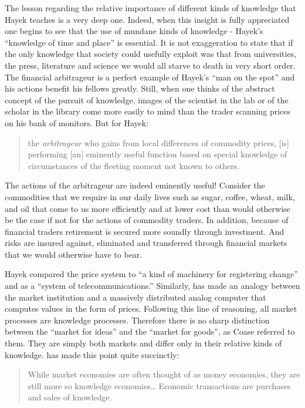 \documentclass[11pt,]{article}
\begin{document}
The lesson regarding the relative importance of different kinds of
knowledge that Hayek teaches is a very deep one. Indeed, when this
insight is fully appreciated one begins to see that the use of mundane
kinds of knowledge - Hayek's ``knowledge of time and place'' is
essential. It is not exaggeration to state that if the only knowledge
that society could usefully exploit was that from universities, the
press, literature and science we would all starve to death in very short
order. The financial arbitrageur is a perfect example of Hayek's ``man
on the spot'' and his actions benefit his fellows greatly. Still, when
one thinks of the abstract concept of the pursuit of knowledge, images
of the scientist in the lab or of the scholar in the library come more
easily to mind than the trader scanning prices on his bank of monitors.
But for Hayek:

\begin{quote}
the \emph{arbitrageur} who gains from local differences of commodity
prices, {[}is{]} performing {[}an{]} eminently useful function based on
special knowledge of circumstances of the fleeting moment not known to
others.
\end{quote}

The actions of the arbitrageur are indeed eminently useful! Consider the
commodities that we require in our daily lives such as sugar, coffee,
wheat, milk, and oil that come to us more efficiently and at lower cost
than would otherwise be the case if not for the actions of commodity
traders. In addition, because of financial traders retirement is secured
more soundly through investment. And risks are insured against,
eliminated and transferred through financial markets that we would
otherwise have to bear.

Hayek compared the price system to ``a kind of machinery for registering
change'' and as a ``system of telecommunications.'' Similarly,
\citet{Scarf1990} has made an analogy between the market institution and
a massively distributed analog computer that computes values in the form
of prices. Following this line of reasoning, all market processes are
knowledge processes. Therefore there is no sharp distinction between the
``market for ideas'' and the ``market for goods'', as Coase referred to
them. They are simply both markets and differ only in their relative
kinds of knowledge. \citet{Sowell1996} has made this point quite
succinctly:

\begin{quote}
While market economies are often thought of as money economies, they are
still more so knowledge economies\ldots{} Economic transactions are
purchases and sales of knowledge.
\end{quote}
\end{document}
